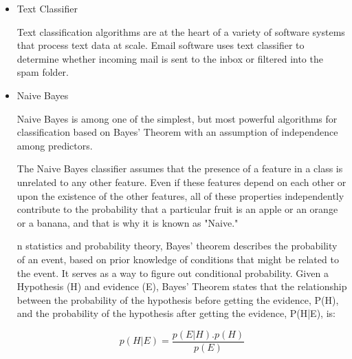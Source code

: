 \documentclass[oneside,a4paper,12pt]{book}
\begin{document}
\begin{itemize}
    \item Text Classifier
    \par Text classification algorithms are at the heart of a variety of software systems that process text data at scale. Email software uses text classifier to determine whether incoming mail is sent to the inbox or filtered into the spam folder.
    \item Naive Bayes
    \par Naive Bayes is among one of the simplest, but most powerful algorithms for classification based on Bayes' Theorem with an assumption of independence among predictors. 
    \par The Naive Bayes classifier assumes that the presence of a feature in a class is unrelated to any other feature. Even if these features depend on each other or upon the existence of the other features, all of these properties independently contribute to the probability that a particular fruit is an apple or an orange or a banana, and that is why it is known as "Naive."
    \par n statistics and probability theory, Bayes' theorem describes the probability of an event, based on prior knowledge of conditions that might be related to the event. It serves as a way to figure out conditional probability.
    Given a Hypothesis (H) and evidence (E), Bayes' Theorem states that the relationship between the probability of the hypothesis before getting the evidence, P(H), and the probability of the hypothesis after getting the evidence, P(H|E), is: \newline
    
    \[p {(H|E)} =\frac{p{(E|H)}.p{(H)}}{p(E)}\]
    

\end{itemize}
\end{document}
